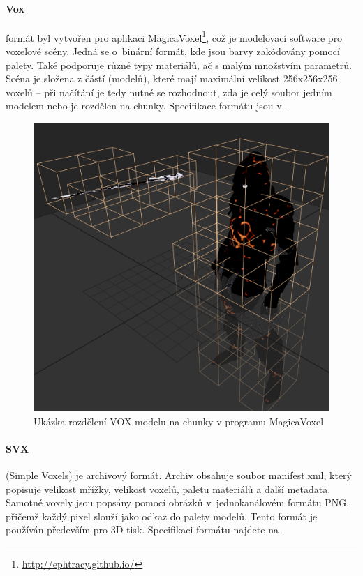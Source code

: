 \paragraph{Vox} formát byl vytvořen pro aplikaci MagicaVoxel\footnote{\url{http://ephtracy.github.io/}}, což je modelovací software pro voxelové scény. Jedná se o~binární formát, kde jsou barvy zakódovány pomocí palety. Také podporuje různé typy materiálů, ač s malým množstvím parametrů. Scéna je složena z částí (modelů), které mají maximální velikost 256x256x256 voxelů -- při načítání je tedy nutné se rozhodnout, zda je celý soubor jedním modelem nebo je rozdělen na chunky. Specifikace formátu jsou v~\cite{vox_format}.

\begin{figure}[H]
	\centering
	\includegraphics[scale=0.5]{images/magica_voxel_vox.png}
	\caption{Ukázka rozdělení VOX modelu na chunky v programu MagicaVoxel}
	\label{fig:magica_vox}
\end{figure}

\paragraph{SVX} (Simple Voxels) je archivový formát. Archiv obsahuje soubor manifest.xml, který popisuje velikost mřížky, velikost voxelů, paletu materiálů a další metadata. Samotné voxely jsou popsány pomocí obrázků v~jednokanálovém formátu PNG, přičemž každý pixel slouží jako odkaz do palety modelů. Tento formát je používán především pro 3D tisk. Specifikaci formátu najdete na \cite{svx_format_2014}.

